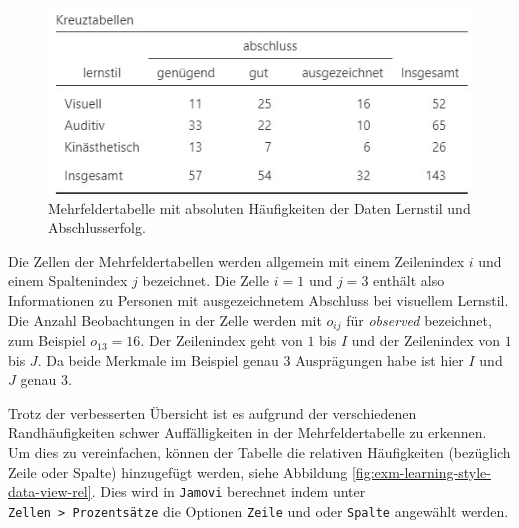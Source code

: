 \documentclass[
]{book}
\theoremstyle{definition}
\theoremstyle{definition}
\theoremstyle{definition}
\theoremstyle{definition}
\theoremstyle{remark}
\begin{document}
\begin{figure}

{\centering \includegraphics{figures/10-exm-learning-style-data-view} 

}

\caption{Mehrfeldertabelle mit absoluten Häufigkeiten der Daten Lernstil und Abschlusserfolg.}\label{fig:exm-learning-style-data-view}
\end{figure}

Die Zellen der Mehrfeldertabellen werden allgemein mit einem Zeilenindex \(i\) und einem Spaltenindex \(j\) bezeichnet. Die Zelle \(i = 1\) und \(j = 3\) enthält also Informationen zu Personen mit ausgezeichnetem Abschluss bei visuellem Lernstil. Die Anzahl Beobachtungen in der Zelle werden mit \(o_{ij}\) für \emph{observed} bezeichnet, zum Beispiel \(o_{13} = 16\). Der Zeilenindex geht von \(1\) bis \(I\) und der Zeilenindex von \(1\) bis \(J\). Da beide Merkmale im Beispiel genau \(3\) Ausprägungen habe ist hier \(I\) und \(J\) genau \(3\).

Trotz der verbesserten Übersicht ist es aufgrund der verschiedenen Randhäufigkeiten schwer Auffälligkeiten in der Mehrfeldertabelle zu erkennen. Um dies zu vereinfachen, können der Tabelle die relativen Häufigkeiten (bezüglich Zeile oder Spalte) hinzugefügt werden, siehe Abbildung \ref{fig:exm-learning-style-data-view-rel}. Dies wird in \texttt{Jamovi} berechnet indem unter \texttt{Zellen\ \textgreater{}\ Prozentsätze} die Optionen \texttt{Zeile} und oder \texttt{Spalte} angewählt werden.
\end{document}
